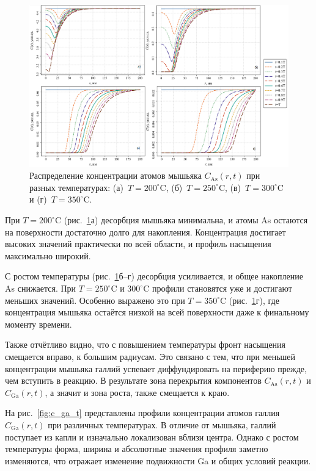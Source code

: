 \documentclass[14pt,oneside]{extarticle}
\begin{document}
\begin{figure}[H]
    \begin{center}
    \includegraphics[width=15cm]{images/C_As_t.png}
    \caption{\label{fig:c_as_t} Распределение концентрации атомов мышьяка $C_{\text{As}}(r, t)$ при разных температурах: (а)~$T = 200^\circ$C, (б)~$T = 250^\circ$C, (в)~$T = 300^\circ$C и (г)~$T = 350^\circ$C.}
    \end{center}
\end{figure}

При $T = 200^\circ$C (рис.~\ref{fig:c_as_t}а) десорбция мышьяка минимальна, и атомы As остаются на поверхности достаточно долго для накопления. Концентрация достигает высоких значений практически по всей области, и профиль насыщения максимально широкий.

С ростом температуры (рис.~\ref{fig:c_as_t}б--г) десорбция усиливается, и общее накопление As снижается. При $T = 250^\circ$C и $300^\circ$C профили становятся уже и достигают меньших значений. Особенно выражено это при $T = 350^\circ$C (рис.~\ref{fig:c_as_t}г), где концентрация мышьяка остаётся низкой на всей поверхности даже к финальному моменту времени.

Также отчётливо видно, что с повышением температуры фронт насыщения смещается вправо, к большим радиусам. Это связано с тем, что при меньшей концентрации мышьяка галлий успевает диффундировать на периферию прежде, чем вступить в реакцию. В результате зона перекрытия компонентов $C_{\text{As}}(r, t)$ и\\
$C_{\text{Ga}}(r, t)$, а значит и зона роста, также смещается к краю.

На рис.~\ref{fig:c_ga_t} представлены профили концентрации атомов галлия $C_{\text{Ga}}(r, t)$ при различных температурах. В отличие от мышьяка, галлий поступает из капли и изначально локализован вблизи центра. Однако с ростом температуры форма, ширина и абсолютные значения профиля заметно изменяются, что отражает изменение подвижности Ga и общих условий реакции.
\end{document}

